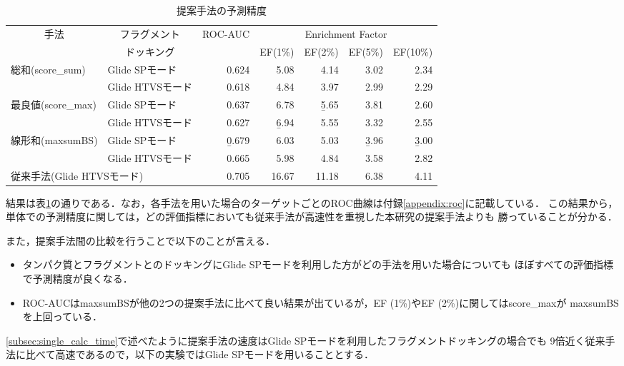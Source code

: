\begin{table}[htb] \centering
	\caption{提案手法の予測精度}
	\label{table:single_accuracy}
	\begin{tabular}{l|l|rrrrr}
	\hline
	\multicolumn{1}{c|}{\multirow{2}{*}{手法}}	&\multicolumn{1}{c|}{フラグメント}		&\multirow{2}{*}{ROC-AUC}	&\multicolumn{4}{c}{Enrichment Factor}	\\
																	&\multicolumn{1}{c|}{ドッキング}		&						&EF(1\%)	&EF(2\%)	&EF(5\%)	&EF(10\%)	\\ \hline
	\multirow{2}{*}{総和(score\_sum)}			&Glide SPモード								&0.624					&5.08	&4.14	&3.02	&2.34		\\
											&Glide HTVSモード							&0.618					&4.84	&3.97	&2.99	&2.29		\\
	\multirow{2}{*}{最良値(score\_max)}		&Glide SPモード								&0.637					&6.78	&\b{5.65}	&3.81	&2.60		\\
											&Glide HTVSモード							&0.627					&\b{6.94}	&5.55	&3.32	&2.55		\\
	\multirow{2}{*}{線形和(maxsumBS)}		&Glide SPモード								&\b{0.679}				&6.03	&5.03	&\b{3.96}	&\b{3.00}		\\
											&Glide HTVSモード							&0.665					&5.98	&4.84	&3.58	&2.82		\\ \hline
	\multicolumn{2}{l|}{従来手法(Glide HTVSモード)}											&0.705					&16.67	&11.18	&6.38	&4.11		\\ \hline
	\end{tabular}
\end{table}

結果は表\ref{table:single_accuracy}の通りである．なお，各手法を用いた場合のターゲットごとのROC曲線は付録\ref{appendix:roc}に記載している．
この結果から，単体での予測精度に関しては，どの評価指標においても従来手法が高速性を重視した本研究の提案手法よりも
勝っていることが分かる．

また，提案手法間の比較を行うことで以下のことが言える．
\begin{itemize}
\item タンパク質とフラグメントとのドッキングにGlide SPモードを利用した方がどの手法を用いた場合についても
	ほぼすべての評価指標で予測精度が良くなる．
\item ROC-AUCはmaxsumBSが他の2つの提案手法に比べて良い結果が出ているが，EF (1\%)やEF (2\%)に関してはscore\_maxが
	maxsumBSを上回っている．
\end{itemize}
\ref{subsec:single_calc_time}で述べたように提案手法の速度はGlide SPモードを利用したフラグメントドッキングの場合でも
9倍近く従来手法に比べて高速であるので，以下の実験ではGlide SPモードを用いることとする．

